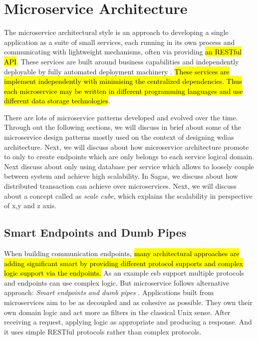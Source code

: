 \section{Microservice Architecture}
\label{se:microservice}

The microservice architectural style is an approach to developing a single application as a suite of small services, each running in its own process and communicating with lightweight mechanisms, often via providing \hl{an RESTful API}. These services are built around business capabilities and independently deployable by fully automated deployment machinery \cite{LewisMicroservices}. \hl{These services are implement independently with minimising the centralized dependencies. Thus each microservice may be written in different programming languages and use different data storage technologies}.


There are lots of microservice patterns developed and evolved over the time. Through out the following sections, we will discuss in brief about some of the microservice design patterns mostly used on the context of designing \acrshort{wdias} architecture. Next, we will discuss about how microservice architecture promote to only to create endpoints which are only belongs to each service logical domain. Next discuss about only using database per service which allows to loosely couple between system and achieve high scalability. In Sagas, we discuss about how distributed transaction can achieve over microservices. Next, we will discuss about a concept called as \emph{scale cube}, which explains the scalability in perspective of x,y and z axis.


\subsection{Smart Endpoints and Dumb Pipes}
\label{subse:dumb_pipes}

When building communication endpoints, \hl{many architectural approaches are adding significant smart by providing different protocol supports and complex logic support via the endpoints.} As an example \acrshort{esb} support multiple protocols and endpoints can use complex logic. But microservice follows alternative approach: \emph{Smart endpoints and dumb pipes} \cite{LewisMicroservicesPipes}.
Applications built from microservices aim to be as decoupled and as cohesive as possible. They own their own domain logic and act more as filters in the classical Unix sense. After receiving a request, applying logic as appropriate and producing a response. And it uses simple RESTful protocols rather than complex protocols.

